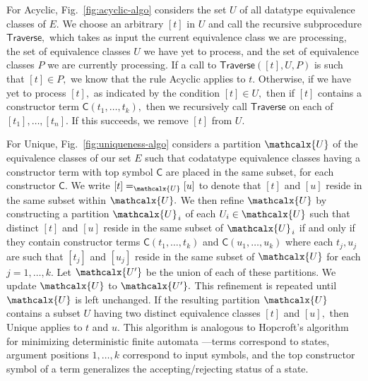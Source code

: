 \documentclass[smallcondensed,draft]{svjour3}
\newcommand\const[1]{\textsf{#1}}
\newcommand{\Ec}{E}
\newcommand{\rn}[1]{\textsf{#1}}
\newcommand{\ec}[1]{[#1]}
\newcommand\vthinspace{\kern+0.083333em}
\begin{document}
For \rn{Acyclic}, Fig.~\ref{fig:acyclic-algo} considers the set $U$ of all datatype equivalence classes of $\Ec.$
We choose an arbitrary $\ec{t}$ in $U$ and call the recursive subprocedure $\rn{Traverse},$
which takes as input the current equivalence class we are processing, the set of equivalence classes $U$ we have yet to process,
and the set of equivalence classes $P$ we are currently processing.
If a call to $\rn{Traverse}( \ec{t}, U, P )$ is such that $\ec{t} \in P,$
we know that the rule \rn{Acyclic} applies to $t.$
Otherwise, if we have yet to process $\ec{t},$ as indicated by the condition $\ec{t} \in U,$
then if $\ec{t}$ contains a constructor term $\const{C}( t_1, \ldots, t_k ),$
then we recursively call $\rn{Traverse}$ on each of $\ec{t_1}, \ldots, \ec{t_n}.$
If this succeeds, we remove $\ec{t}$ from $U.$

For \rn{Unique}, Fig.~\ref{fig:uniqueness-algo} considers a partition $\mathcalx{U}$ of the equivalence classes of our set $\Ec$
such that codatatype equivalence classes having a constructor term with top symbol $\const{C}$ are placed in the same subset,
for each constructor $\const{C}.$
We write $\ec{t} =_{\mathcalx{U}} \ec{u}$ to denote that $\ec{t}$ and $\ec{u}$ reside in the same subset within $\mathcalx{U}.$
We then refine $\mathcalx{U}$ by
constructing a partition $\mathcalx{U}_{\vthinspace i}$ of each $U_i \in \mathcalx{U}$ such that distinct $\ec{t}$ and $\ec{u}$ reside in the same subset of $\mathcalx{U}_{\vthinspace i}$
if and only if they contain constructor terms $\const{C}( t_1, \ldots, t_k )$ and $\const{C}( u_1, \ldots, u_k )$
where each $t_j, u_j$ are such that $\ec{t_j}$ and $\ec{u_j}$ reside in the same subset of $\mathcalx{U}$ for each $j=1, \ldots, k.$
Let $\mathcalx{U'}$ be the union of each of these partitions.
We update $\mathcalx{U}$ to $\mathcalx{U'}.$
This refinement is repeated until $\mathcalx{U}$ is left unchanged.
If the resulting partition $\mathcalx{U}$ contains a subset $U$ having two distinct equivalence classes $\ec{t}$ and $\ec{u},$ then \rn{Unique} applies to $t$ and $u.$
This algorithm is analogous to Hopcroft's algorithm for minimizing
deterministic finite automata \cite{hopcroft-1971}---terms correspond to
states, argument positions $1,\ldots,k$ correspond to input symbols, and the top constructor symbol
of a term generalizes the accepting/rejecting status of a state.
\end{document}
